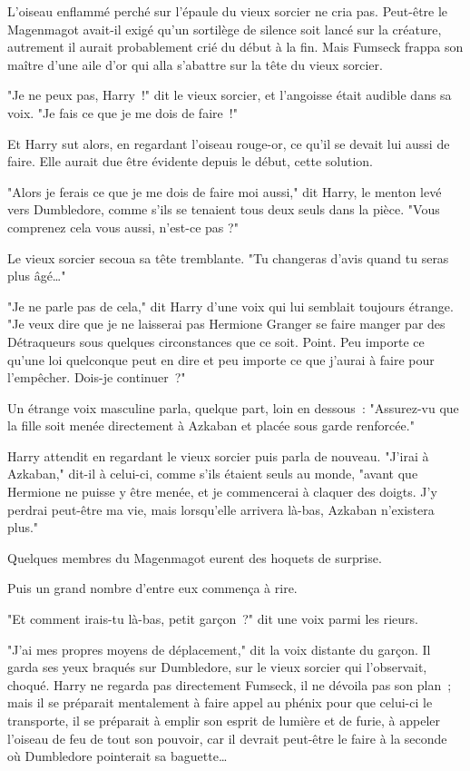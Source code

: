 L'oiseau enflammé perché sur l'épaule du vieux sorcier ne cria pas. Peut-être le Magenmagot avait-il exigé qu'un sortilège de silence soit lancé sur la créature, autrement il aurait probablement crié du début à la fin. Mais Fumseck frappa son maître d'une aile d'or qui alla s'abattre sur la tête du vieux sorcier.

"Je ne peux pas, Harry~!" dit le vieux sorcier, et l'angoisse était audible dans sa voix. "Je fais ce que je me dois de faire~!"

Et Harry sut alors, en regardant l'oiseau rouge-or, ce qu'il se devait lui aussi de faire. Elle aurait due être évidente depuis le début, cette solution.

"Alors je ferais ce que je me dois de faire moi aussi," dit Harry, le menton levé vers Dumbledore, comme s'ils se tenaient tous deux seuls dans la pièce. "Vous comprenez cela vous aussi, n'est-ce pas ?"

Le vieux sorcier secoua sa tête tremblante. "Tu changeras d'avis quand tu seras plus âgé…"

"Je ne parle pas de cela," dit Harry d'une voix qui lui semblait toujours étrange. "Je veux dire que je ne laisserai pas Hermione Granger se faire manger par des Détraqueurs sous quelques circonstances que ce soit. Point. Peu importe ce qu'une loi quelconque peut en dire et peu importe ce que j'aurai à faire pour l'empêcher. Dois-je continuer~?"

Un étrange voix masculine parla, quelque part, loin en dessous~: "Assurez-vu que la fille soit menée directement à Azkaban et placée sous garde renforcée."

Harry attendit en regardant le vieux sorcier puis parla de nouveau. "J'irai à Azkaban," dit-il à celui-ci, comme s'ils étaient seuls au monde, "avant que Hermione ne puisse y être menée, et je commencerai à claquer des doigts. J'y perdrai peut-être ma vie, mais lorsqu'elle arrivera là-bas, Azkaban n'existera plus."

Quelques membres du Magenmagot eurent des hoquets de surprise.

Puis un grand nombre d'entre eux commença à rire.

"Et comment irais-tu là-bas, petit garçon~?" dit une voix parmi les rieurs.

"J'ai mes propres moyens de déplacement," dit la voix distante du garçon. Il garda ses yeux braqués sur Dumbledore, sur le vieux sorcier qui l'observait, choqué. Harry ne regarda pas directement Fumseck, il ne dévoila pas son plan~; mais il se préparait mentalement à faire appel au phénix pour que celui-ci le transporte, il se préparait à emplir son esprit de lumière et de furie, à appeler l'oiseau de feu de tout son pouvoir, car il devrait peut-être le faire à la seconde où Dumbledore pointerait sa baguette…

